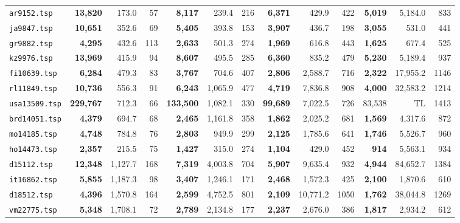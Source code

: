 \documentclass[ijoo,nonblindrev]{informs-ijoo}
\begin{document}
\begin{table}[!hbtp]
{\begin{tabular}{|l|rrr|rrr|rrr|rrr|}
			\texttt{ar9152.tsp} & \textbf{13,820} & 173.0 & 57 & \textbf{8,117} & 239.4 & 216 & \textbf{6,371} & 429.9 & 422 & \textbf{5,019} & 5,184.0 & 833\\
			\texttt{ja9847.tsp} & \textbf{10,651} & 352.6 & 69 & \textbf{5,405} & 393.8 & 153 & \textbf{3,907} & 436.7 & 198 & \textbf{3,055} & 531.0 & 441\\
			\texttt{gr9882.tsp} & \textbf{4,295} & 432.6 & 113 & \textbf{2,633} & 501.3 & 274 & \textbf{1,969} & 616.8 & 443 & \textbf{1,625} & 677.4 & 525\\
			\texttt{kz9976.tsp} & \textbf{13,969} & 415.9 & 94 & \textbf{8,607} & 495.5 & 285 & \textbf{6,360} & 835.2 & 479 & \textbf{5,230} & 5,189.4 & 937\\
			\texttt{fi10639.tsp} & \textbf{6,284} & 479.3 & 83 & \textbf{3,767} & 704.6 & 407 & \textbf{2,806} & 2,588.7 & 716 & \textbf{2,322} & 17,955.2 & 1146\\
			\texttt{rl11849.tsp} & \textbf{10,736} & 556.3 & 91 & \textbf{6,243} & 1,065.9 & 477 & \textbf{4,719} & 7,836.8 & 908 & \textbf{4,000} & 32,583.2 & 1214\\
			\texttt{usa13509.tsp} & \textbf{229,767} & 712.3 & 66 & \textbf{133,500} & 1,082.1 & 330 & \textbf{99,689} & 7,022.5 & 726 & 83,538 & TL & 1413\\
			\texttt{brd14051.tsp} & \textbf{4,379} & 694.7 & 68 & \textbf{2,465} & 1,161.8 & 358 & \textbf{1,862} & 2,025.2 & 681 & \textbf{1,569} & 4,317.6 & 872\\
			\texttt{mo14185.tsp} & \textbf{4,748} & 784.8 & 76 & \textbf{2,803} & 949.9 & 299 & \textbf{2,125} & 1,785.6 & 641 & \textbf{1,746} & 5,526.7 & 960\\
			\texttt{ho14473.tsp} & \textbf{2,357} & 215.5 & 75 & \textbf{1,427} & 315.0 & 274 & \textbf{1,104} & 429.0 & 452 & \textbf{914} & 5,563.1 & 934\\
			\texttt{d15112.tsp} & \textbf{12,348} & 1,127.7 & 168 & \textbf{7,319} & 4,003.8 & 704 & \textbf{5,907} & 9,635.4 & 932 & \textbf{4,944} & 84,652.7 & 1384\\
			\texttt{it16862.tsp} & \textbf{5,855} & 1,187.3 & 98 & \textbf{3,407} & 1,246.1 & 171 & \textbf{2,468} & 1,572.3 & 425 & \textbf{2,100} & 1,870.6 & 610\\
			\texttt{d18512.tsp} & \textbf{4,396} & 1,570.8 & 164 & \textbf{2,599} & 4,752.5 & 801 & \textbf{2,109} & 10,771.2 & 1050 & \textbf{1,762} & 38,044.8 & 1269\\
			\texttt{vm22775.tsp} & \textbf{5,348} & 1,708.1 & 72 & \textbf{2,789} & 2,134.8 & 177 & \textbf{2,237} & 2,676.0 & 386 & \textbf{1,817} & 2,934.2 & 612\\

\end{tabular}}
\end{table}
\end{document}
